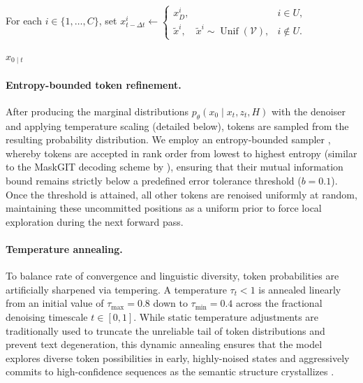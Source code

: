 \documentclass[11pt, a4paper, logo, copyright, gdm]{google}
\newcommand{\unif}{\operatorname{Unif}}
\newcommand{\Vcal}{\mathcal{V}}
\begin{document}
\begin{algorithm}[t!]
\begin{algorithmic}[1]
        \State For each $i\in\{1,\ldots,C\}$, set
        \Statex \hspace{\algorithmicindent}
            $\displaystyle
            x_{t-\Delta t}^i \gets
            \begin{cases}
                x_D^i,
                    & i\in U,\\
                \tilde{x}^i,\quad
                    \tilde{x}^i\sim\unif(\Vcal),
                    & i\notin U.
            \end{cases}$
    \EndIf
\EndFor

\State \Return $\hat{x}_{0\mid t}$
\end{algorithmic}
\end{algorithm}

\paragraph{Entropy-bounded token refinement.} After producing the marginal distributions $p_{\theta}(x_0 \mid x_t, z_t, H)$ with the denoiser and applying temperature scaling (detailed below), tokens are sampled from the resulting probability distribution. We employ an entropy-bounded sampler \citep{ben2026accelerated}, whereby tokens are accepted in rank order from lowest to highest entropy (similar to the MaskGIT decoding scheme by \citet{Changetal2022}), ensuring that their mutual information bound remains strictly below a predefined error tolerance threshold ($b=0.1$). Once the threshold is attained, all other tokens are renoised uniformly at random, maintaining these uncommitted positions as a uniform prior to force local exploration during the next forward pass.

\paragraph{Temperature annealing.} To balance rate of convergence and linguistic diversity, token probabilities are artificially sharpened via tempering. A temperature $\tau_t < 1$ is annealed linearly from an initial value of $\tau_{\max}=0.8$ down to $\tau_{\min}=0.4$ across the fractional denoising timescale $t \in [0, 1]$. While static temperature adjustments are traditionally used to truncate the unreliable tail of token distributions and prevent text degeneration, this dynamic annealing ensures that the model explores diverse token possibilities in early, highly-noised states and aggressively commits to high-confidence sequences as the semantic structure crystallizes \citep{xiao2024edt}.  
\end{document}
